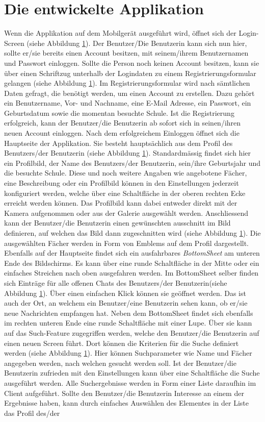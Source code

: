 \documentclass[a4paper,11pt]{report}
\begin{document}
	\section{Die entwickelte Applikation}%
	Wenn die Applikation auf dem Mobilgerät ausgeführt wird, öffnet sich der Login-Screen (siehe Abbildung \ref{}). Der Benutzer/Die Benutzerin kann sich nun hier, sollte er/sie bereits einen Account besitzen, mit seinem/ihrem Benutzernamen und Passwort einloggen. Sollte die Person noch keinen Account besitzen, kann sie über einen Schriftzug unterhalb der Logindaten zu einem Registrierungsformular gelangen (siehe Abbildung \ref{}). Im Registrierungsformular wird nach sämtlichen Daten gefragt, die benötigt werden, um einen Account zu erstellen. Dazu gehört ein Benutzername, Vor- und Nachname, eine E-Mail Adresse, ein Passwort, ein Geburtsdatum sowie die momentan besuchte Schule. Ist die Registrierung erfolgreich, kann der Benutzer/die Benutzerin ab sofort sich in seinen/ihren neuen Account einloggen. Nach dem erfolgreichem Einloggen öffnet sich die Hauptseite der Applikation. Sie besteht hauptsächlich aus dem Profil des Benutzers/der Benutzerin (siehe Abbildung \ref{}). Standardmässig findet sich hier ein Profilbild, der Name des Benutzers/der Benutzerin, sein/ihre Geburtsjahr und die besuchte Schule. Diese und noch weitere Angaben wie angebotene Fächer, eine Beschreibung oder ein Profilbild können in den Einstellungen jederzeit konfiguriert werden, welche über eine Schaltfläche in der oberen rechten Ecke erreicht werden können. Das Profilbild kann dabei entweder direkt mit der Kamera aufgenommen oder aus der Galerie ausgewählt werden. Anschliessend kann der Benutzer/die Benutzerin einen gewünschten ausschnitt im Bild definieren, auf welchen das Bild dann zugeschnitten wird (siehe Abbildung \ref{}). Die ausgewählten Fächer werden in Form von Emblems auf dem Profil dargestellt. Ebenfalls auf der Hauptseite findet sich ein ausfahrbares \emph{BottomSheet} am unteren Ende des Bildschirms. Es kann über eine runde Schaltfläche in der Mitte oder ein einfaches Streichen nach oben ausgefahren werden. Im BottomSheet selber finden sich Einträge für alle offenen Chats des Benutzers/der Benutzerin(siehe Abbildung \ref{}). Über einen einfachen Klick können sie geöffnet werden. Das ist auch der Ort, an welchem ein Benutzer/eine Benutzerin sehen kann, ob er/sie neue Nachrichten empfangen hat. Neben dem BottomSheet findet sich ebenfalls im rechten unteren Ende eine runde Schaltfläche mit einer Lupe. Über sie kann auf das Such-Feature zugegriffen werden, welche den Benutzer/die Benutzerin auf einen neuen Screen führt. Dort können die Kriterien für die Suche definiert werden (siehe Abbildung \ref{}). Hier können Suchparameter wie Name und Fächer angegeben werden, nach welchen gesucht werden soll. Ist der Benutzer/die Benutzerin zufrieden mit den Einstellungen kann über eine Schaltfläche die Suche ausgeführt werden. Alle Suchergebnisse werden in Form einer Liste daraufhin im Client aufgeführt. Sollte den Benutzer/die Benutzerin Interesse an einem der Ergebnisse haben, kann durch einfaches Auswählen des Elementes in der Liste das Profil des/der 
\end{document}
